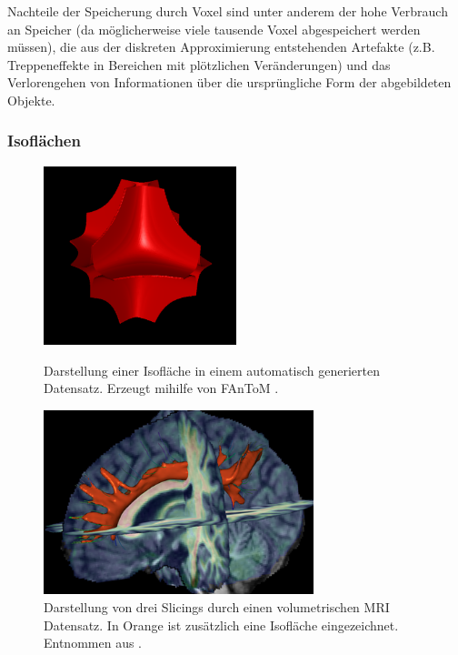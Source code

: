 \documentclass[a4paper,fontsize=12pt,toc=bib,halfparskip]{scrartcl}
\begin{document}
Nachteile der Speicherung durch Voxel sind unter anderem der hohe Verbrauch an Speicher (da m\"oglicherweise viele tausende Voxel abgespeichert werden m\"ussen), die aus der diskreten Approximierung entstehenden Artefakte (z.B. Treppeneffekte in Bereichen mit pl\"otzlichen Ver\"anderungen) und das Verlorengehen von Informationen \"uber die urspr\"ungliche Form der abgebildeten Objekte.

\subsubsection{Isofl\"achen}
\begin{figure}
	\begin{minipage}{0.5\textwidth}
		\centering
		\includegraphics[width=0.5\textwidth]{pictures/isosurface.png}
		\caption{Darstellung einer Isofl\"ache in einem automatisch generierten Datensatz. Erzeugt mihilfe von FAnToM \cite{fantomWebsite}.} 
		\label{Isosurface}
	\end{minipage}
	\hspace{0.5cm}
	\begin{minipage}{0.5\textwidth}
		\centering
		\includegraphics[width=0.7\textwidth]{pictures/slicing.png}
		\caption{Darstellung von drei Slicings durch einen volumetrischen MRI Datensatz. In Orange ist zus\"atzlich eine Isofl\"ache eingezeichnet. Entnommen aus \cite{vis15}.}
		\label{Slicing}
	\end{minipage}
\end{figure}
\end{document}
